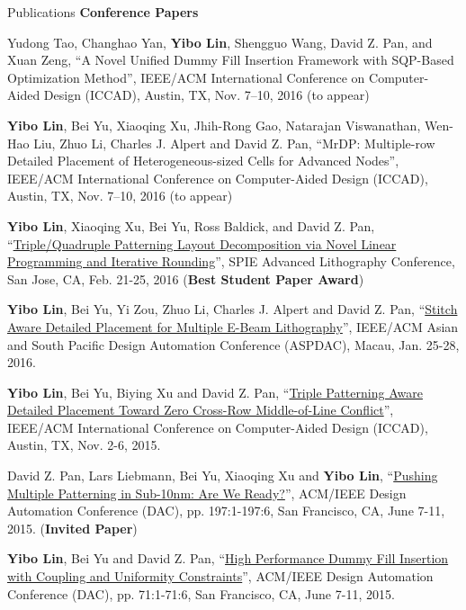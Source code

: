 \begin{rSection}{Publications}
\textbf{Conference Papers}
\begin{description}[font=\normalfont]
\item[{[C7]}]{
    Yudong Tao, Changhao Yan, \textbf{Yibo Lin}, Shengguo Wang, David Z. Pan, and Xuan Zeng, 
    ``A Novel Unified Dummy Fill Insertion Framework with SQP-Based Optimization Method'', 
    IEEE/ACM International Conference on Computer-Aided Design (ICCAD), Austin, TX, Nov. 7–10, 2016
    (to appear)
}
\item[{[C6]}]{
    \textbf{Yibo Lin}, Bei Yu, Xiaoqing Xu, Jhih-Rong Gao, Natarajan Viswanathan, Wen-Hao Liu, Zhuo Li, Charles J. Alpert and David Z. Pan, 
    ``MrDP: Multiple-row Detailed Placement of Heterogeneous-sized Cells for Advanced Nodes'', 
    IEEE/ACM International Conference on Computer-Aided Design (ICCAD), Austin, TX, Nov. 7–10, 2016
    (to appear)
}
\item[{[C5]}]{
    \textbf{Yibo Lin}, Xiaoqing Xu, Bei Yu, Ross Baldick, and David Z. Pan, 
 ``\href{proceedings.spiedigitallibrary.org/proceeding.aspx?articleid=2505329}{Triple/Quadruple Patterning Layout Decomposition via Novel Linear Programming and Iterative Rounding}'', 
    SPIE Advanced Lithography Conference, San Jose, CA, Feb. 21-25, 2016
    (\textbf{Best Student Paper Award})
}
\item[{[C4]}]{
 \textbf{Yibo Lin}, Bei Yu, Yi Zou, Zhuo Li, Charles J. Alpert and David Z. Pan, 
 ``\href{http://ieeexplore.ieee.org/xpl/articleDetails.jsp?arnumber=7428009}{Stitch Aware Detailed Placement for Multiple E-Beam Lithography}'', 
    IEEE/ACM Asian and South Pacific Design Automation Conference (ASPDAC), Macau, Jan. 25-28, 2016.
}
\item[{[C3]}]{
 \textbf{Yibo Lin}, Bei Yu, Biying Xu and David Z. Pan, 
 ``\href{http://dl.acm.org/citation.cfm?id=2840875}{Triple Patterning Aware Detailed Placement Toward Zero Cross-Row Middle-of-Line Conflict}'', 
    IEEE/ACM International Conference on Computer-Aided Design (ICCAD), Austin, TX, Nov. 2-6, 2015.
}
\item[{[C2]}]{
 David Z. Pan, Lars Liebmann, Bei Yu, Xiaoqing Xu and \textbf{Yibo Lin}, 
 ``\href{http://dl.acm.org/citation.cfm?id=2744769.2747940}{Pushing Multiple Patterning in Sub-10nm: Are We Ready?}'', 
    ACM/IEEE Design Automation Conference (DAC), pp. 197:1-197:6, San Francisco, CA, June 7-11, 2015. 
    (\textbf{Invited Paper})
}
\item[{[C1]}]{
 \textbf{Yibo Lin}, Bei Yu and David Z. Pan, 
 ``\href{http://dl.acm.org/citation.cfm?id=2744769.2744850}{High Performance Dummy Fill Insertion with Coupling and Uniformity Constraints}'',
    ACM/IEEE Design Automation Conference (DAC), pp. 71:1-71:6, San Francisco, CA, June 7-11, 2015. 
}
\end{description}


\end{rSection}

